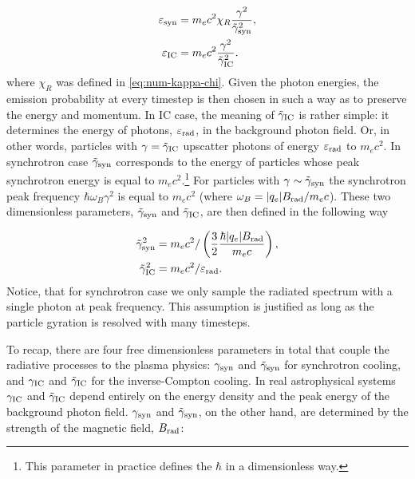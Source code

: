 \begin{equation}
    \begin{aligned}
        \varepsilon_{\rm syn} &= m_e c^2 \chi_R\frac{\gamma^2}{\tilde{\gamma}_{\rm syn}^2},\\
        \varepsilon_{\rm IC} &= m_e c^2 \frac{\gamma^2}{\tilde{\gamma}_{\rm IC}^2}.
    \end{aligned}
\end{equation}
\noindent where $\chi_R$ was defined in \eqref{eq:num-kappa-chi}. Given the photon energies, the emission probability at every timestep is then chosen in such a way as to preserve the energy and momentum. In IC case, the meaning of $\tilde{\gamma}_{\rm IC}$ is rather simple: it determines the energy of photons, $\varepsilon_{\rm rad}$, in the background photon field. Or, in other words, particles with $\gamma=\tilde{\gamma}_{\rm IC}$ upscatter photons of energy $\varepsilon_{\rm rad}$ to $m_e c^2$. In synchrotron case $\tilde{\gamma}_{\rm syn}$ corresponds to the energy of particles whose peak synchrotron energy is equal to $m_e c^2$.\footnote{This parameter in practice defines the $\hbar$ in a dimensionless way.} For particles with $\gamma\sim \tilde{\gamma}_{\rm syn}$ the synchrotron peak frequency $\hbar \omega_B \gamma^2$ is equal to $m_e c^2$ (where $\omega_B = |q_e| B_{\rm rad} / m_e c$). These two dimensionless parameters, $\tilde{\gamma}_{\rm syn}$ and $\tilde{\gamma}_{\rm IC}$, are then defined in the following way

\begin{equation}
\begin{aligned}
    \tilde{\gamma}_{\rm syn}^2 &= m_e c^2 / \left(\frac{3}{2}\frac{\hbar |q_e| B_{\rm rad}}{m_e c}\right),\\
    \tilde{\gamma}_{\rm IC}^2 &= m_e c^2 / \varepsilon_{\rm rad}. 
\end{aligned}
\end{equation}
\noindent Notice, that for synchrotron case we only sample the radiated spectrum with a single photon at peak frequency. This assumption is justified as long as the particle gyration is resolved with many timesteps.

To recap, there are four free dimensionless parameters in total that couple the radiative processes to the plasma physics: $\gamma_{\rm syn}$ and $\tilde{\gamma}_{\rm syn}$ for synchrotron cooling, and $\gamma_{\rm IC}$ and $\tilde{\gamma}_{\rm IC}$ for the inverse-Compton cooling. In real astrophysical systems $\gamma_{\rm IC}$ and $\tilde{\gamma}_{\rm IC}$ depend entirely on the energy density and the peak energy of the background photon field. $\gamma_{\rm syn}$ and $\tilde{\gamma}_{\rm syn}$, on the other hand, are determined by the strength of the magnetic field, $B_{\rm rad}$:

